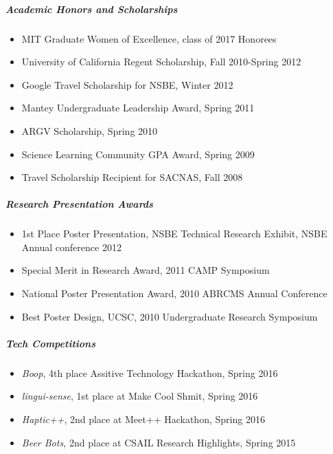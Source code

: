 \documentclass[10pt,letterpaper]{article}
\begin{document}
\subparagraph{Academic Honors and Scholarships}
\begin{itemize}
\item MIT Graduate Women of Excellence, class of 2017 Honorees
\item University of California Regent Scholarship, Fall 2010-Spring 2012 
\item  Google Travel Scholarship for NSBE,  Winter 2012 
\item Mantey Undergraduate Leadership Award,  Spring 2011 
 \item ARGV Scholarship, Spring 2010 
\item  Science Learning Community GPA Award, Spring 2009 
\item Travel Scholarship Recipient for SACNAS, Fall 2008 
\end{itemize}

\subparagraph{Research Presentation Awards}
\begin{itemize}
\item 1st Place Poster Presentation, NSBE Technical Research Exhibit, NSBE Annual conference 2012
\item Special Merit in Research Award,  2011 CAMP Symposium 
\item  National Poster Presentation Award, 2010 ABRCMS Annual Conference
\item Best Poster Design, UCSC, 2010 Undergraduate Research Symposium
\end{itemize}

\subparagraph{Tech Competitions}
\begin{itemize}
\item {\em Boop}, 4th place Assitive Technology Hackathon, Spring 2016
\item {\em lingui-sense}, 1st place at Make Cool Shmit, Spring 2016
\item {\em Haptic++}, 2nd place at Meet++ Hackathon, Spring 2016
\item {\em Beer Bots,} 2nd place at CSAIL Research Highlights, Spring 2015 
\end{itemize}
\end{document}
